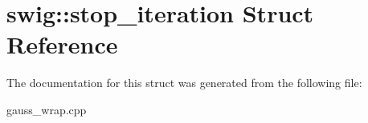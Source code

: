 \hypertarget{structswig_1_1stop__iteration}{\section{swig\-:\-:stop\-\_\-iteration Struct Reference}
\label{structswig_1_1stop__iteration}
}


The documentation for this struct was generated from the following file\-:\begin{DoxyCompactItemize}
\item 
gauss\-\_\-wrap.\-cpp\end{DoxyCompactItemize}
